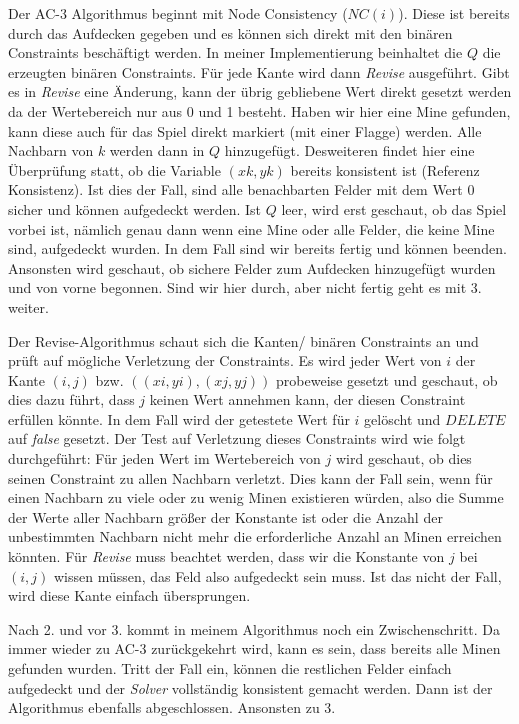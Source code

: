 Der AC-3 Algorithmus beginnt mit Node Consistency ($NC(i)$). Diese ist bereits durch das Aufdecken gegeben und es können sich direkt mit den
binären Constraints beschäftigt werden. In meiner Implementierung beinhaltet die $Q$ die erzeugten binären Constraints. Für jede Kante wird
dann \textit{Revise} ausgeführt. Gibt es in \textit{Revise} eine Änderung, kann der übrig gebliebene Wert direkt gesetzt werden da der 
Wertebereich nur aus 0 und 1 besteht. Haben wir hier eine Mine gefunden, kann diese auch für das Spiel direkt markiert (mit einer Flagge)
werden. Alle Nachbarn von $k$ werden dann in $Q$ hinzugefügt. Desweiteren findet hier eine Überprüfung statt, ob die Variable $(xk, yk)$ bereits
konsistent ist (Referenz Konsistenz). Ist dies der Fall, sind alle benachbarten Felder mit dem Wert 0 sicher und können aufgedeckt werden.
Ist $Q$ leer, wird erst geschaut, ob das Spiel vorbei ist, nämlich genau dann wenn eine Mine oder alle Felder, die keine Mine sind, aufgedeckt
wurden. In dem Fall sind wir bereits fertig und können beenden. Ansonsten wird geschaut, ob sichere Felder zum Aufdecken hinzugefügt wurden
und von vorne begonnen. Sind wir hier durch, aber nicht fertig geht es mit 3. weiter.

Der Revise-Algorithmus schaut sich die Kanten/ binären Constraints an und prüft auf mögliche Verletzung der Constraints. Es wird jeder Wert
von $i$ der Kante $(i,j)$ bzw. $((xi, yi), (xj, yj))$ probeweise gesetzt und geschaut, ob dies dazu führt, dass $j$ keinen Wert annehmen kann,
der diesen Constraint erfüllen könnte. In dem Fall wird der getestete Wert für $i$ gelöscht und $DELETE$ auf \textit{false} gesetzt. Der Test
auf Verletzung dieses Constraints wird wie folgt durchgeführt: Für jeden Wert im Wertebereich von $j$ wird geschaut, ob dies seinen Constraint
zu allen Nachbarn verletzt. Dies kann der Fall sein, wenn für einen Nachbarn zu viele oder zu wenig Minen existieren würden, also die Summe
der Werte aller Nachbarn größer der Konstante ist oder die Anzahl der unbestimmten Nachbarn nicht mehr die erforderliche Anzahl an Minen 
erreichen könnten. 
Für \textit{Revise} muss beachtet werden, dass wir die Konstante von $j$ bei $(i,j)$ wissen müssen, das Feld also aufgedeckt sein muss. Ist
das nicht der Fall, wird diese Kante einfach übersprungen.

Nach 2. und vor 3. kommt in meinem Algorithmus noch ein Zwischenschritt. Da immer wieder zu AC-3 zurückgekehrt wird, kann es sein, dass bereits
alle Minen gefunden wurden. Tritt der Fall ein, können die restlichen Felder einfach aufgedeckt und der \textit{Solver} vollständig
konsistent gemacht werden. Dann ist der Algorithmus ebenfalls abgeschlossen. Ansonsten zu 3.

